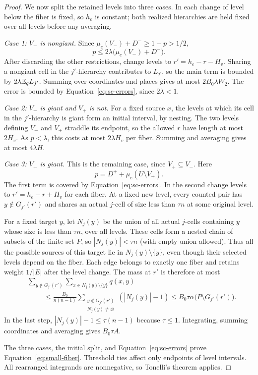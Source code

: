 \begin{proof}
We now split the retained levels into three cases.  In each change of
level below the fiber is fixed, so $h_e$ is constant; both realized
hierarchies are held fixed over all levels before any averaging.

\smallskip\noindent
\emph{Case 1: $V_-$ is nongiant.}
Since $\mu_e(V_-)+D^-\ge1-p>1/2$,
\[
 p\le2\lambda\bigl(\mu_e(V_-)+D^-\bigr).
\]
After discarding the other restrictions, change levels to
$r'=h_e-r-H_v$.  Sharing a nongiant cell in the $j'$-hierarchy
contributes to $L_{j'}$, so the main term is bounded by
$2\lambda\mathbb E_qL_{j'}$.  Summing over coordinates and places gives
at most $2B_0\lambda W_2$.  The error is bounded by
Equation~\eqref{eq:sc-errors}, since $2\lambda<1$.

\smallskip\noindent
\emph{Case 2: $V_-$ is giant and $V_+$ is not.}
For a fixed source $x$, the levels at which its cell in the
$j'$-hierarchy is giant form an initial interval, by nesting.
The two levels defining $V_-$ and $V_+$ straddle its endpoint, so
the allowed $r$ have length at most $2H_v$.  As $p<\lambda$, this
costs at most $2\lambda H_v$ per fiber.  Summing and averaging gives
at most $4\lambda H$.

\smallskip\noindent
\emph{Case 3: $V_+$ is giant.}
This is the remaining case, since $V_+\subseteq V_-$.  Here
\[
 p=D^++\mu_e(U\setminus V_+).
\]
The first term is covered by Equation~\eqref{eq:sc-errors}.
In the second change levels to $r'=h_e-r+H_v$ for each fiber.
At a fixed new level, every counted pair has
$y\notin G_{j'}(r')$ and shares an actual $j$-cell of size less than
$\tau n$ at some original level.

For a fixed target $y$, let $N_j(y)$ be the union of all actual
$j$-cells containing $y$ whose size is less than $\tau n$, over all
levels.  These cells form a nested chain of subsets of the finite set
$P$, so $|N_j(y)|<\tau n$ (with empty union allowed).
Thus all the possible sources of this target lie in
$N_j(y)\setminus\{y\}$, even though their selected levels depend on
the fiber.  Each edge belongs to exactly one fiber and retains weight
$1/|E|$ after the level change.  The mass at $r'$ is therefore at most
\begin{align*}
 &\sum_{y\notin G_{j'}(r')}
   \sum_{x\in N_j(y)\setminus\{y\}}q(x,y)\\
 &\hspace{1cm}\le
 \frac{B_0}{n(n-1)}
 \sum_{\substack{y\notin G_{j'}(r')\\N_j(y)\ne\varnothing}}
       (|N_j(y)|-1)
 \le B_0\tau\alpha\bigl(P\setminus G_{j'}(r')\bigr).
\end{align*}
In the last step, $|N_j(y)|-1\le\tau(n-1)$ because $\tau\le1$.
Integrating, summing coordinates and averaging gives $B_0\tau A$.

The three cases, the initial split, and Equation~\eqref{eq:sc-errors}
prove Equation~\eqref{eq:small-fiber}.  Threshold ties affect only
endpoints of level intervals.  All rearranged integrands are
nonnegative, so Tonelli's theorem applies.
\end{proof}

